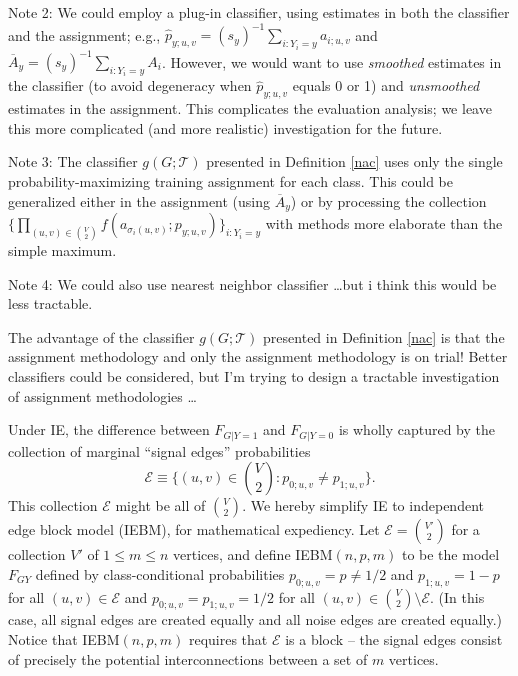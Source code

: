 \documentclass{article}
\newcommand{\mcE}{\mathcal{E}}
\newcommand{\mcT}{\mathcal{T}}
\newcommand{\hatp}{\widehat{p}}
\begin{document}
Note 2:
We could employ a plug-in classifier,
using estimates in both the classifier and the assignment;
e.g., $\hatp_{y;u,v} = (s_y)^{-1} \sum_{i:Y_i=y} a_{i;u,v}$
and $\overline{A}_y = (s_y)^{-1} \sum_{i:Y_i=y} A_{i}$.
However, we would want to use {\em smoothed} estimates in the classifier
(to avoid degeneracy when $\hatp_{y;u,v}$ equals 0 or 1)
and {\em unsmoothed} estimates in the assignment.
This complicates the evaluation analysis;
we leave this more complicated (and more realistic) investigation for the future.

Note 3:
The classifier $g(G;\mcT)$ presented in Definition \ref{nac}
uses only the single probability-maximizing training assignment for each class.
This could be generalized either in the assignment (using $\overline{A}_y$)
or by processing the collection
$\{\prod_{(u,v) \in {V \choose 2}} f(a_{\sigma_i(u,v)};p_{y;u,v})\}_{i:Y_i=y}$
with methods more elaborate than the simple maximum.

Note 4:
We could also use nearest neighbor classifier \dots but i think this would be less tractable.

The advantage of the classifier $g(G;\mcT)$ presented in Definition \ref{nac}
is that the assignment methodology and only the assignment methodology is on trial!
Better classifiers could be considered,
but I'm trying to design a tractable investigation of assignment methodologies \dots


Under IE,
the difference between
$F_{G|Y=1}$ and $F_{G|Y=0}$
is wholly captured by the collection of marginal ``signal edges'' probabilities
$$\mcE \equiv \{(u,v) \in {V \choose 2}: p_{0;u,v} \neq p_{1;u,v}\}.$$
This collection $\mcE$ might be all of ${V \choose 2}$.
We hereby simplify IE to independent edge block model (IEBM), for mathematical expediency.
Let $\mcE = {V' \choose 2}$ for a collection $V'$ of $1 \leq m \leq n$ vertices,
and define
IEBM$(n,p,m)$ to be the model $F_{GY}$ defined by class-conditional probabilities
$p_{0;u,v}=p \neq 1/2$ and $p_{1;u,v}=1-p$ for all $(u,v) \in \mcE$
and $p_{0;u,v}=p_{1;u,v}=1/2$ for all $(u,v) \in {V \choose 2} \setminus \mcE$.
(In this case, all signal edges are created equally and all noise edges are created equally.)
Notice that
IEBM$(n,p,m)$ requires that $\mcE$ is a block --
the signal edges consist of precisely the potential interconnections between a set of $m$ vertices.
\end{document}
